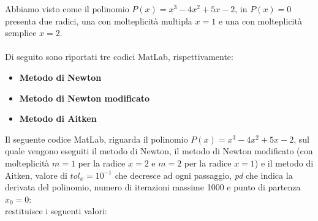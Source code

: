 Abbiamo visto come il polinomio $P(x) = x^3-4x^2+5x-2$, in $P(x)=0$ presenta due radici, una con molteplicità multipla $x=1$ e una con molteplicità semplice $x=2$.\\\\
Di seguito sono riportati tre codici MatLab, rispettivamente:
\begin{itemize}
	\item \textbf{Metodo di Newton}
		
	\item \textbf{Metodo di Newton modificato}
		
	\item \textbf{Metodo di Aitken}
		
\end{itemize}
Il seguente codice MatLab, riguarda il polinomio $P(x) = x^3-4x^2+5x-2$, sul quale vengono eseguiti il metodo di Newton, il metodo di Newton modificato (con molteplicità $m=1$ per la radice $x=2$ e $m=2$ per la radice $x=1$) e il metodo di Aitken, valore di $tol_x=10^{-1}$ che decresce ad ogni passaggio, \textit{pd} che indica la derivata del polinomio, numero di iterazioni massime 1000 e punto di partenza $x_{0}=0$:\\
	
restituisce i seguenti valori:\\
